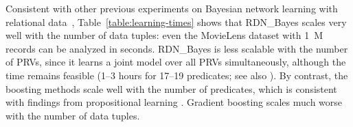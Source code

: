 \documentclass{sfuthesis}
\begin{document}
Consistent with other previous experiments on Bayesian network learning with relational data~\cite{Khosravi2010,Schulte2012}, Table~\ref{table:learning-times} shows that RDN\_Bayes scales very well with the number of data tuples: even the MovieLens dataset with 1~M records can be analyzed in seconds. 
RDN\_Bayes is less scalable with the number of PRVs, since it learns a joint model over all PRVs simultaneously,  although the time  remains feasible (1--3 hours for 17--19 predicates; see also \cite{Schulte2012}). By contrast, the boosting methods scale well with the number of predicates, which is consistent with findings from  propositional learning \cite{Heckerman2000}.
Gradient boosting scales much worse with the number of data tuples.
 
\end{document}
